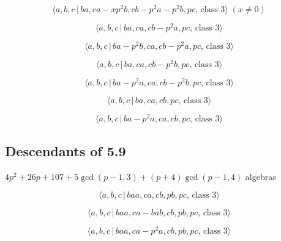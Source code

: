 \documentclass[10pt]{article}
\begin{document}
\begin{equation}
\langle a,b,c\,|\,ba,ca-xp^2b,cb-p^2a-p^2b,pc,\,\text{class }3\rangle \;(x
\neq 0)  \tag{7.979}
\end{equation}

\begin{equation}
\langle a,b,c\,|\,ba,ca,cb-p^2a,pc,\,\text{class }3\rangle  \tag{7.980}
\end{equation}

\begin{equation}
\langle a,b,c\,|\,ba-p^2b,ca,cb-p^2a,pc,\,\text{class }3\rangle  \tag{7.981}
\end{equation}

\begin{equation}
\langle a,b,c\,|\,ba,ca,cb-p^2b,pc,\,\text{class }3\rangle  \tag{7.982}
\end{equation}

\begin{equation}
\langle a,b,c\,|\,ba-p^2a,ca,cb-p^2b,pc,\,\text{class }3\rangle  \tag{7.983}
\end{equation}

\begin{equation}
\langle a,b,c\,|\,ba,ca,cb,pc,\,\text{class }3\rangle  \tag{7.984}
\end{equation}

\begin{equation}
\langle a,b,c\,|\,ba-p^2a,ca,cb,pc,\,\text{class }3\rangle  \tag{7.985}
\end{equation}

\subsection{Descendants of 5.9}

$4p^{2}+26p+107+5\gcd (p-1,3)+(p+4)\gcd (p-1,4)$ algebras

\begin{equation}
\langle a,b,c\,|\,baa,ca,cb,pb,pc,\,\text{class }3\rangle  \tag{7.986}
\end{equation}

\begin{equation}
\langle a,b,c\,|\,baa,ca-bab,cb,pb,pc,\,\text{class }3\rangle  \tag{7.987}
\end{equation}

\begin{equation}
\langle a,b,c\,|\,baa,ca-p^2a,cb,pb,pc,\,\text{class }3\rangle  \tag{7.988}
\end{equation}
\end{document}
